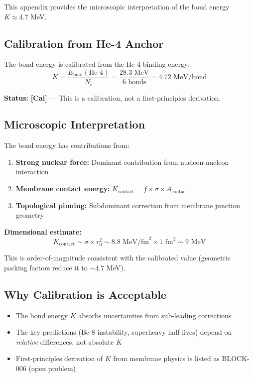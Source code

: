 \documentclass[11pt,a4paper]{article}
\newcommand{\tagCal}{\textcolor{purple!70!black}{\textbf{[Cal]}}}
\begin{document}
This appendix provides the microscopic interpretation of the bond energy $K \approx 4.7$ MeV.

\subsection{Calibration from He-4 Anchor}

The bond energy is calibrated from the He-4 binding energy:
\begin{equation}
    K = \frac{E_{\text{bind}}(\text{He-4})}{N_b} = \frac{28.3 \text{ MeV}}{6 \text{ bonds}} = 4.72 \text{ MeV/bond}
    \label{eq:K_calibration}
\end{equation}

\textbf{Status:} \tagCal{} --- This is a calibration, not a first-principles derivation.

\subsection{Microscopic Interpretation}

The bond energy has contributions from:
\begin{enumerate}
    \item \textbf{Strong nuclear force:} Dominant contribution from nucleon-nucleon interaction
    \item \textbf{Membrane contact energy:} $K_{\text{contact}} = f \times \sigma \times A_{\text{contact}}$
    \item \textbf{Topological pinning:} Subdominant correction from membrane junction geometry
\end{enumerate}

\textbf{Dimensional estimate:}
\begin{equation}
    K_{\text{contact}} \sim \sigma \times r_0^2 \sim 8.8 \text{ MeV/fm}^2 \times 1 \text{ fm}^2 \sim 9 \text{ MeV}
\end{equation}

This is order-of-magnitude consistent with the calibrated value (geometric packing factors reduce it to $\sim 4.7$ MeV).

\subsection{Why Calibration is Acceptable}

\begin{itemize}[nosep]
    \item The bond energy $K$ absorbs uncertainties from sub-leading corrections
    \item The key predictions (Be-8 instability, superheavy half-lives) depend on \emph{relative} differences, not absolute $K$
    \item First-principles derivation of $K$ from membrane physics is listed as BLOCK-006 (open problem)
\end{itemize}
\end{document}
